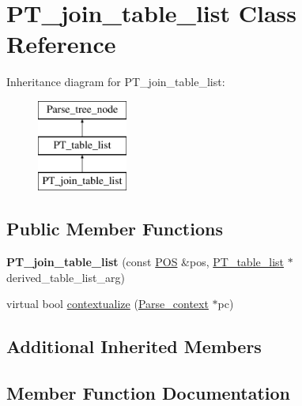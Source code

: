 \hypertarget{classPT__join__table__list}{}\section{P\+T\+\_\+join\+\_\+table\+\_\+list Class Reference}
\label{classPT__join__table__list}
Inheritance diagram for P\+T\+\_\+join\+\_\+table\+\_\+list\+:\begin{figure}[H]
\begin{center}
\leavevmode
\includegraphics[height=3.000000cm]{classPT__join__table__list}
\end{center}
\end{figure}
\subsection*{Public Member Functions}
\begin{DoxyCompactItemize}
\item 
\mbox{\label{classPT__join__table__list_aee6408e0c0f96f4ff068cbc72ad2b42b}} 
{\bfseries P\+T\+\_\+join\+\_\+table\+\_\+list} (const \mbox{\hyperlink{structYYLTYPE}{P\+OS}} \&pos, \mbox{\hyperlink{classPT__table__list}{P\+T\+\_\+table\+\_\+list}} $\ast$derived\+\_\+table\+\_\+list\+\_\+arg)
\item 
virtual bool \mbox{\hyperlink{classPT__join__table__list_aa2132ff1c28ed350c33a266626e46dc7}{contextualize}} (\mbox{\hyperlink{structParse__context}{Parse\+\_\+context}} $\ast$pc)
\end{DoxyCompactItemize}
\subsection*{Additional Inherited Members}


\subsection{Member Function Documentation}
\mbox{\label{classPT__join__table__list_aa2132ff1c28ed350c33a266626e46dc7}} 
